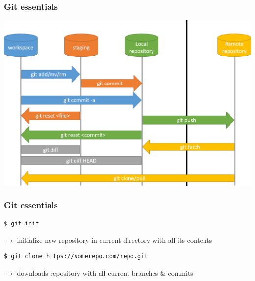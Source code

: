 \documentclass{beamer}
\begin{document}
    \begin{frame}
        \frametitle{Git essentials}
        \includegraphics[width=\textwidth]{workflow.png}
    \end{frame}
    \begin{frame}[fragile]
        \frametitle{Git essentials}
        \begin{lstlisting}[gobble=12]
            $ git init
        \end{lstlisting}
        $\rightarrow$ initialize new repository in current directory with all its contents
        \begin{lstlisting}[gobble=12]
            $ git clone https://somerepo.com/repo.git
        \end{lstlisting}
        $\rightarrow$ downloads repository with all current branches \& commits
    \end{frame}
\end{document}
